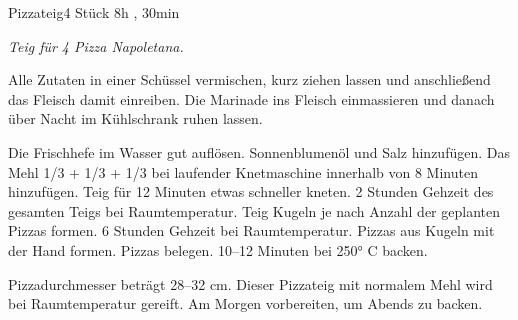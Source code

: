 \documentclass[../recipe-collections/cooking.tex]{subfiles}
\begin{document}
\begin{recipe}{Pizzateig}{4 Stück }{8h , 30min }

  \freeform{}\textit{Teig für 4 Pizza Napoletana.}


  Alle Zutaten in einer Schüssel vermischen, kurz ziehen lassen und anschließend das Fleisch damit einreiben.
  Die Marinade ins Fleisch einmassieren und danach über Nacht im Kühlschrank ruhen lassen.


  Die Frischhefe im Wasser gut auflösen.
  Sonnenblumenöl und Salz hinzufügen.
  Das Mehl 1/3 + 1/3 + 1/3 bei laufender Knetmaschine innerhalb von 8 Minuten hinzufügen.
  Teig für 12 Minuten etwas schneller kneten.
  2 Stunden Gehzeit des gesamten Teigs bei Raumtemperatur.
  Teig Kugeln je nach Anzahl der geplanten Pizzas formen.
  6 Stunden Gehzeit bei Raumtemperatur.
  Pizzas aus Kugeln mit der Hand formen.
  Pizzas belegen.
  10–12 Minuten bei 250° C backen.

  \freeform{}\hrulefill{}

  \freeform{}
  Pizzadurchmesser beträgt 28–32 cm.
  Dieser Pizzateig mit normalem Mehl wird bei Raumtemperatur gereift.
  Am Morgen vorbereiten, um Abends zu backen.

\end{recipe}
\end{document}
